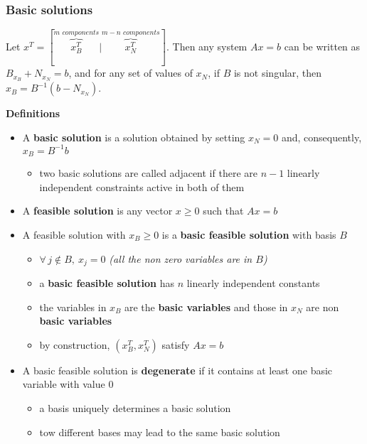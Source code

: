 \documentclass[english]{article}
\begin{document}
\subsubsection{Basic solutions}
\label{sec:basic-solutions}

Let \(x^T = [ \overbrace{x_B^T}^{m\textit{ components}} |  \overbrace{x_N^T}^{m-n \textit{ components}}]\).
Then any system \(Ax = b\) can be written as \(B _{x_B} + N_{x_N} = b\), and for any set of values of \(x_N\), if \(B\) is not singular, then \(x_B = B^{-1} (b - N_{x_N})\).

\bigskip
\textbf{Definitions}
\begin{itemize}
  \item A \textbf{basic solution} is a solution obtained by setting \(x_N = 0\) and, consequently, \(x_B = B^{-1} b\)
        \begin{itemize}
          \item two basic solutions are called adjacent if there are \(n-1\) linearly independent constraints active in both of them
        \end{itemize}
  \item A \textbf{feasible solution} is any vector \(x \geq 0\) such that \(Ax = b\)
  \item A feasible solution with \(x_B \geq 0\) is a \textbf{basic feasible solution} with basis \(B\)
        \begin{itemize}
          \item \(\forall \, j \notin B, \ x_j = 0\) \textit{(all the non zero variables are in \(B\))}
          \item a \textbf{basic feasible solution} has \(n\) linearly independent constants
          \item the variables in \(x_B\) are the \textbf{basic variables} and those in \(x_N\) are non \textbf{basic variables}
          \item by construction, \(\left( x_B^T, x_N^T \right)\) satisfy \(Ax = b\)
        \end{itemize}
  \item A basic feasible solution is \textbf{degenerate} if it contains at least one basic variable with value \(0\)
        \begin{itemize}
          \item a basis uniquely determines a basic solution
          \item tow different bases may lead to the same basic solution
        \end{itemize}
\end{itemize}
\end{document}
